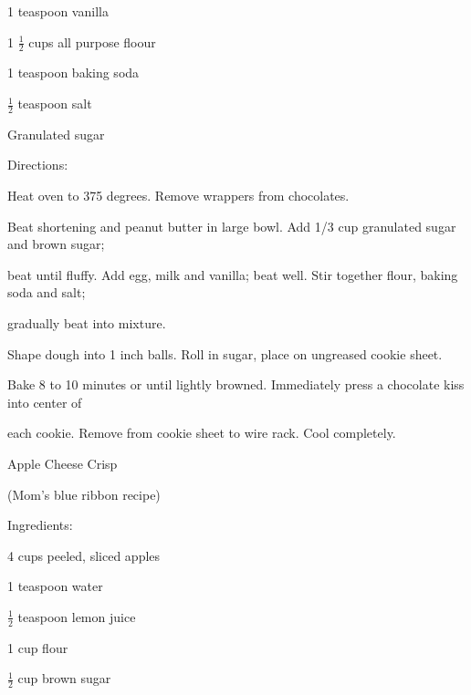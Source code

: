 \documentclass[a4paper,portrait,12pt]{book}
\begin{document}
1 teaspoon vanilla




1 $\frac{1}{2}$ cups all purpose floour




1 teaspoon baking soda




$\frac{1}{2}$ teaspoon salt




Granulated sugar




Directions:




Heat oven to 375 degrees. Remove wrappers from chocolates.




Beat shortening and peanut butter in large bowl. Add 1/3 cup granulated sugar and brown sugar;




beat until fluffy. Add egg, milk and vanilla; beat well. Stir together flour, baking soda and salt;




gradually beat into mixture.




Shape dough into 1 inch balls. Roll in sugar, place on ungreased cookie sheet.




Bake 8 to 10 minutes or until lightly browned. Immediately press a chocolate kiss into center of




each cookie. Remove from cookie sheet to wire rack. Cool completely.







\newpage
Apple Cheese Crisp




(Mom's blue ribbon recipe)




Ingredients:




4 cups peeled, sliced apples




1 teaspoon water




$\frac{1}{2}$ teaspoon lemon juice




1 cup flour




$\frac{1}{2}$ cup brown sugar
\end{document}
